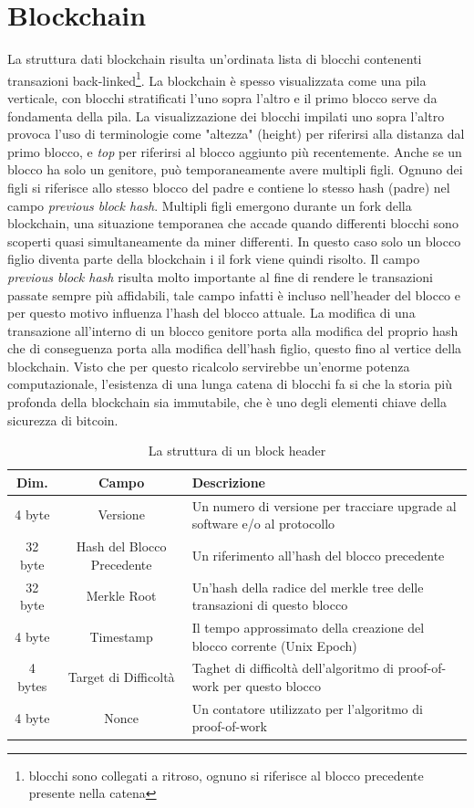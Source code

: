 \section{Blockchain}
La struttura dati blockchain risulta un'ordinata lista di blocchi contenenti transazioni back-linked\footnote{blocchi sono collegati a ritroso, ognuno si riferisce al blocco precedente presente nella catena}. La blockchain è spesso visualizzata come una pila verticale, con blocchi stratificati l’uno sopra l’altro e il primo blocco serve da fondamenta della pila. La visualizzazione dei blocchi impilati uno sopra l’altro provoca l’uso di terminologie come "altezza" (height) per riferirsi alla distanza dal primo blocco, e \textit{top} per riferirsi al blocco aggiunto più recentemente. Anche se un blocco ha solo un genitore, può temporaneamente avere multipli figli. Ognuno dei figli si riferisce allo stesso blocco del padre e contiene lo stesso hash (padre) nel campo \textit{previous block hash}. Multipli figli emergono durante un fork della blockchain, una situazione temporanea che accade quando differenti blocchi sono scoperti quasi simultaneamente da miner differenti. In questo caso solo un blocco figlio diventa parte della blockchain i il fork viene quindi risolto. Il campo \textit{previous block hash} risulta molto importante al fine di rendere le transazioni passate sempre più affidabili, tale campo infatti è incluso nell'header del blocco e per questo motivo influenza l'hash del blocco attuale. La modifica di una transazione all'interno di un blocco genitore porta alla modifica del proprio hash che di conseguenza porta alla modifica dell'hash figlio, questo fino al vertice della blockchain. Visto che per questo ricalcolo servirebbe un’enorme
potenza computazionale, l’esistenza di una lunga catena di blocchi fa si che la storia più profonda della blockchain sia immutabile, che è uno degli elementi chiave della sicurezza di bitcoin.
\begin{table}[]
	\centering
	\begin{tabular}{|c|c|p{6cm}|}
		\hline
		\textbf{Dim.} 		&	\textbf{Campo} 					& \textbf{Descrizione} \\ \hline
		4 byte						& Versione 							& Un numero di versione per tracciare upgrade al software e/o al protocollo \\ \hline
		32 byte 					& Hash del Blocco Precedente 		& Un riferimento all’hash del blocco precedente \\ \hline
		32 byte 					& Merkle Root 						& Un’hash della radice del merkle tree delle transazioni di questo blocco \\ \hline
		4 byte 						& Timestamp 						& Il tempo approssimato della creazione del blocco corrente (Unix Epoch)\\ \hline
		4 bytes 					& Target di Difficoltà				& Taghet di difficoltà dell’algoritmo di proof-of-work per questo blocco \\ \hline
		4 byte 						& Nonce 							& Un contatore utilizzato per l’algoritmo di proof-of-work\\ \hline
	\end{tabular}
	\caption{La struttura di un block header}
	\label{tab:struttura-block-header}
\end{table}
